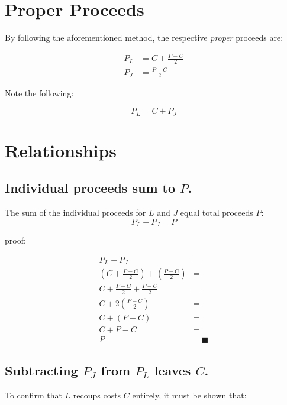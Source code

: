 \documentclass[10pt,letterpaper,oneside]{article}
\begin{document}
\section{Proper Proceeds}
By following the aforementioned method, the respective \emph{proper} proceeds are:

\begin{align}
P_L &= C + \frac{P-C}{2} \\[10pt]
P_J &= \frac{P-C}{2}
\end{align}

\noindent
Note the following:

\begin{equation}
P_L = C + P_J       \label{l_e_c_plus_j}
\end{equation}


\section{Relationships}

\subsection{Individual proceeds sum to $P$.}
The sum of the individual proceeds for $L$ and $J$ equal total proceeds $P$:
\begin{equation}
P_L + P_J = P
\end{equation}

\noindent
proof:

\begin{align*}
P_L + P_J &=  \\[10pt]
\left(C + \frac{P-C}{2}\right) + \left(\frac{P-C}{2}\right) &= \\[10pt]
C + \frac{P-C}{2} + \frac{P-C}{2} &= \\[10pt]
C + 2\left( \frac{P-C}{2} \right)  &= \\[10pt]
C + \left( P-C \right)  &= \\[10pt]
C + P-C &= \\[10pt]
P & \quad\blacksquare
\end{align*}

\newpage
\subsection{Subtracting $P_J$ from $P_L$ leaves $C$.}
To confirm that $L$ recoups costs $C$ entirely, it must be shown that:
\end{document}
